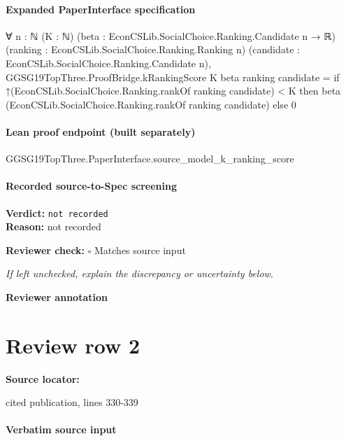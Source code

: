 \documentclass[10pt]{article}
\newcommand{\reviewerbox}{%
  \par\noindent\fbox{\parbox{0.96\linewidth}{\rule{0pt}{0.38in}}}\par
}
\newcommand{\reviewmatch}[1]{%
  \par\noindent\textbf{Reviewer check:} $\square$\; #1\par
  \noindent\emph{If left unchecked, explain the discrepancy or uncertainty below.}\par
}
\begin{document}
\paragraph{Expanded PaperInterface specification}
\begin{ReviewVerbatim}
∀ {n : ℕ} (K : ℕ) (beta : EconCSLib.SocialChoice.Ranking.Candidate n → ℝ)
  (ranking : EconCSLib.SocialChoice.Ranking.Ranking n) (candidate : EconCSLib.SocialChoice.Ranking.Candidate n),
  GGSG19TopThree.ProofBridge.kRankingScore K beta ranking candidate =
    if ↑(EconCSLib.SocialChoice.Ranking.rankOf ranking candidate) < K then
      beta (EconCSLib.SocialChoice.Ranking.rankOf ranking candidate)
    else 0
\end{ReviewVerbatim}

\paragraph{Lean proof endpoint (built separately)}\begin{ReviewVerbatim}
GGSG19TopThree.PaperInterface.source_model_k_ranking_score
\end{ReviewVerbatim}

\paragraph{Recorded source-to-Spec screening}
\textbf{Verdict:} \texttt{not recorded}
\\
\textbf{Reason:} not recorded
\reviewmatch{Matches source input}
\noindent\textbf{Reviewer annotation}\par
\reviewerbox
\clearpage
\hypertarget{source-claim-997b02af7db4352f}{}
\section*{Review row 2}
\textbf{Source locator:} {\footnotesize\raggedright cited publication, lines 330-\allowbreak{}339\par}
\paragraph{Verbatim source input}
\end{document}
